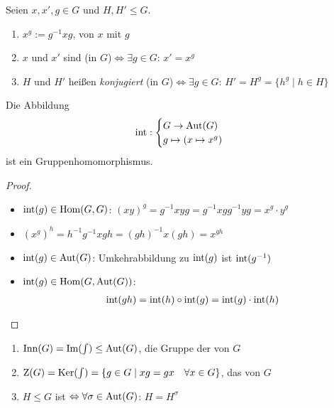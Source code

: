 \begin{definition}[Konjugation]
	Seien $x,x',g\in G$ und $H,H'\le G$.
	\begin{enumerate}[label=(\alph*)]
		\item $x^g:= g^{-1}xg$,  von $x$ mit $g$
		\item $x$ und $x'$ sind  (in $G$)$\Leftrightarrow\exists g\in G$: $x'=x^g$
		\item $H$ und $H'$ heißen \emph{konjugiert} (in $G$)$\Leftrightarrow\exists g\in G$: $H'=H^g=\{h^g\mid h\in H\}$
	\end{enumerate}
\end{definition}

\begin{lemma}
	Die Abbildung
	\begin{align}
		\operatorname{int}:\begin{cases}
			G\to \operatorname{Aut}(G) \\ g\mapsto (x\mapsto x^g)
		\end{cases}\notag
	\end{align}
	ist ein Gruppenhomomorphismus.
\end{lemma}
\begin{proof}
	\begin{itemize}
		\item $\operatorname{int}(g)\in\operatorname{Hom}(G,G)$: $(xy)^g=g^{-1}xyg=g^{-1}xgg^{-1}yg=x^g\cdot y^g$
		\item $(x^g)^h=h^{-1}g^{-1}xgh=(gh)^{-1}x(gh)=x^{gh}$
		\item $\operatorname{int}(g)\in\operatorname{Aut}(G)$: Umkehrabbildung zu $\operatorname{int}(g)$ ist $\operatorname{int}(g^{-1})$
		\item $\operatorname{int}(g)\in\operatorname{Hom}(G,\operatorname{Aut}(G))$:
		\begin{align}
			\operatorname{int}(gh)=\operatorname{int}(h)\circ\operatorname{int}(g)=\operatorname{int}(g)\cdot\operatorname{int}(h)\notag
		\end{align}
	\end{itemize}
\end{proof}

\begin{definition}
	\begin{enumerate}[label=(\alph*)]
		\item $\operatorname{Inn}(G)=\operatorname{Im}(\int)\le\operatorname{Aut}(G)$, die Gruppe der  von $G$
		\item $\operatorname{Z}(G)=\operatorname{Ker}(\int)=\{g\in G\mid xg=gx\quad\forall x\in G\}$, das  von $G$
		\item $H\le G$ ist  $\Leftrightarrow\forall\sigma\in\operatorname{Aut}(G)$: $H=H^\sigma$
	\end{enumerate}
\end{definition}

